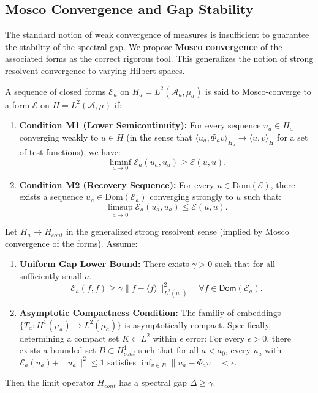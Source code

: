 \subsection{Mosco Convergence and Gap Stability}
The standard notion of weak convergence of measures is insufficient to guarantee the stability of the spectral gap. We propose \textbf{Mosco convergence} of the associated forms as the correct rigorous tool. This generalizes the notion of strong resolvent convergence to varying Hilbert spaces.

\begin{definition}
A sequence of closed forms $\mathcal{E}_a$ on $H_a = L^2(\mathcal{A}_a, \mu_a)$ is said to Mosco-converge to a form $\mathcal{E}$ on $H = L^2(\mathcal{A}, \mu)$ if:
\begin{enumerate}
    \item \textbf{Condition M1 (Lower Semicontinuity):} For every sequence $u_a \in H_a$ converging weakly to $u \in H$ (in the sense that $\langle u_a, \Phi_a v \rangle_{H_a} \to \langle u, v \rangle_{H}$ for a set of test functions), we have:
    \[ \liminf_{a \to 0} \mathcal{E}_a(u_a, u_a) \ge \mathcal{E}(u, u). \]
    \item \textbf{Condition M2 (Recovery Sequence):} For every $u \in \text{Dom}(\mathcal{E})$, there exists a sequence $u_a \in \text{Dom}(\mathcal{E}_a)$ converging strongly to $u$ such that:
    \[ \limsup_{a \to 0} \mathcal{E}_a(u_a, u_a) \le \mathcal{E}(u, u). \]
\end{enumerate}
\end{definition}

\begin{theorem}
\label{thm:mosco-gap-transfer}
Let $H_a \to H_{cont}$ in the generalized strong resolvent sense (implied by Mosco convergence of the forms).
Assume:
\begin{enumerate}
    \item \textbf{Uniform Gap Lower Bound:} There exists $\gamma > 0$ such that for all sufficiently small $a$,
    \[
    \mathcal{E}_a(f, f) \ge \gamma \|f - \langle f \rangle\|^2_{L^2(\mu_a)} \quad \forall f \in \mathsf{Dom}(\mathcal{E}_a).
    \]
    \item \textbf{Asymptotic Compactness Condition:} The familiy of embeddings $\{T_a: H^1(\mu_a) \to L^2(\mu_a)\}$ is asymptotically compact. Specifically, determining a compact set $K \subset L^2$ within $\epsilon$ error:
    For every $\epsilon > 0$, there exists a bounded set $B \subset H^1_{cont}$ such that for all $a < a_0$, every $u_a$ with $\mathcal{E}_a(u_a) + \|u_a\|^2 \le 1$ satisfies $\inf_{v \in B} \|u_a - \Phi_a v\| < \epsilon$.
\end{enumerate}
Then the limit operator $H_{cont}$ has a spectral gap $\Delta \ge \gamma$.
\end{theorem}


